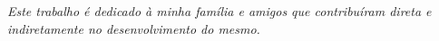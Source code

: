 %
%

\thispagestyle{empty}

\begin{dedicatoria}	
\textit{Este trabalho é dedicado à minha família e amigos que contribuíram direta e indiretamente no desenvolvimento do mesmo.}
\end{dedicatoria}